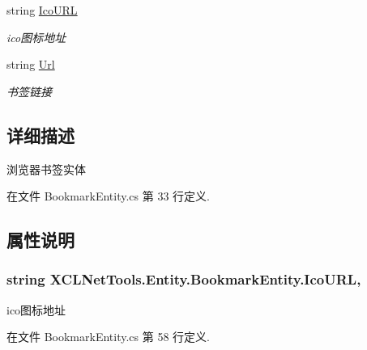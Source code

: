 \begin{DoxyCompactItemize}
string \hyperlink{class_x_c_l_net_tools_1_1_entity_1_1_bookmark_entity_af370dbfd32e8cde501e305c6999c077b}{Ico\-U\-R\-L}
\begin{DoxyCompactList}\small\item\em ico图标地址 \end{DoxyCompactList}\item 
string \hyperlink{class_x_c_l_net_tools_1_1_entity_1_1_bookmark_entity_a88ebfe2441fd5804a82f5eaee1ce3232}{Url}
\begin{DoxyCompactList}\small\item\em 书签链接 \end{DoxyCompactList}\end{DoxyCompactItemize}


\subsection{详细描述}
浏览器书签实体 



在文件 Bookmark\-Entity.\-cs 第 33 行定义.



\subsection{属性说明}
\hypertarget{class_x_c_l_net_tools_1_1_entity_1_1_bookmark_entity_af370dbfd32e8cde501e305c6999c077b}{
\subsubsection[{Ico\-U\-R\-L}]{\setlength{\rightskip}{0pt plus 5cm}string X\-C\-L\-Net\-Tools.\-Entity.\-Bookmark\-Entity.\-Ico\-U\-R\-L\hspace{0.3cm}{\ttfamily [get]}, {\ttfamily [set]}}}\label{class_x_c_l_net_tools_1_1_entity_1_1_bookmark_entity_af370dbfd32e8cde501e305c6999c077b}


ico图标地址 



在文件 Bookmark\-Entity.\-cs 第 58 行定义.

